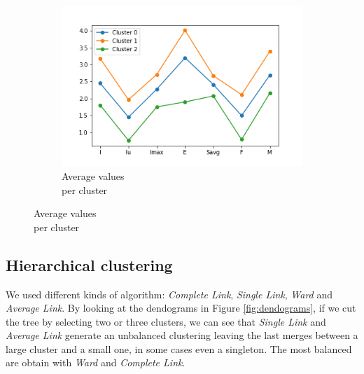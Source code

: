 \begin{figure}[h!]
\begin{subfigure}{0.32\textwidth}
        \includegraphics[width=\textwidth]{img/clustering/cluster_avg.png}
	\caption{Average values\\ per cluster}
        \label{fig:km_avg}
    \end{subfigure}
\end{figure}

\subsection{Hierarchical clustering}
We used different kinds of algorithm: \emph{Complete Link}, \emph{Single Link}, \emph{Ward} and \emph{Average Link}. By looking at the dendograms in Figure \ref{fig:dendograms}, if we cut the tree by selecting two or three clusters, we can see that \emph{Single Link} and \emph{Average Link} generate an unbalanced clustering leaving the last merges between a large cluster and a small one, in some cases even a singleton. The most balanced are obtain with \emph{Ward} and \emph{Complete Link}.

